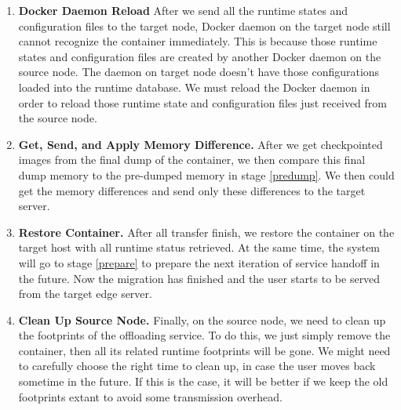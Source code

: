 \begin{enumerate}[label=\textbf{S\arabic*}]
\item \label{daemon-Reload} \textbf{Docker Daemon Reload} After we send all the runtime states and configuration files to the target node, Docker daemon on the target node still cannot recognize the container immediately.  This is because those runtime states and configuration files are created by another Docker daemon on the source node. The daemon on target node doesn't have those configurations loaded into the runtime database. We  must reload the Docker daemon in order to reload those runtime state and configuration files just received from the source node.

\item \label{img-sync} \textbf{Get, Send, and Apply Memory Difference.} After we get checkpointed images from the final dump of the container, we then compare this final dump memory to the pre-dumped memory in stage \ref{predump}. We then could get the memory differences and send only these differences to the target server. 

\item \label{restore} \textbf{Restore Container.} After all transfer finish, we restore the container on the target host with all runtime status retrieved. At the same time, the system will go to stage \ref{prepare} to prepare the next iteration of service handoff in the future. Now the migration has finished and the user starts to be served from the target edge server.

\item \label{clean} \textbf{Clean Up Source Node.} Finally, on the source node, we need to clean up the footprints of the offloading service. To do this, we just simply remove the container, then all its related runtime footprints will be gone. We might need to carefully choose the right time to clean up, in case the user moves back sometime in the future. If this is the case, it will be better if we keep the old footprints extant to avoid some transmission overhead. 


\end{enumerate}



% 
% 

